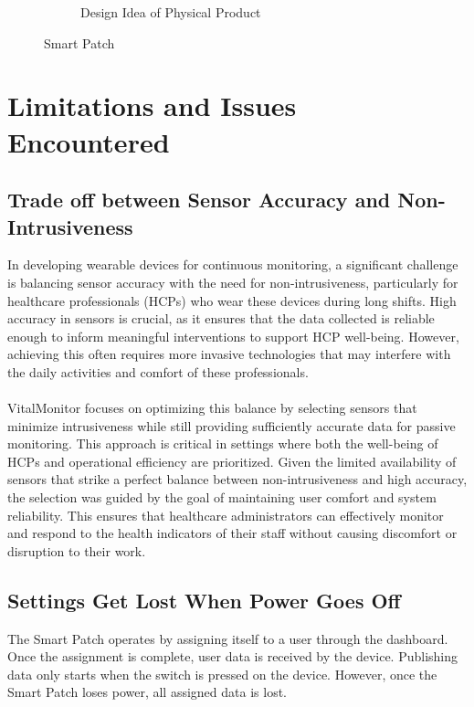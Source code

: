\begin{figure}[h!]
\begin{subfigure}[b]{0.45\linewidth}
        \caption{Design Idea of Physical Product}
        \label{fig:fig-design}
    \end{subfigure}
    \caption{Smart Patch}
    \label{fig:fig-smartpatch}
\end{figure}

\section{Limitations and Issues Encountered}

\subsection{Trade off between Sensor Accuracy and Non-Intrusiveness}
In developing wearable devices for continuous monitoring, a significant challenge is balancing sensor accuracy with the need for non-intrusiveness, particularly for healthcare professionals (HCPs) who wear these devices during long shifts. High accuracy in sensors is crucial, as it ensures that the data collected is reliable enough to inform meaningful interventions to support HCP well-being. However, achieving this often requires more invasive technologies that may interfere with the daily activities and comfort of these professionals.\\ \\
VitalMonitor focuses on optimizing this balance by selecting sensors that minimize intrusiveness while still providing sufficiently accurate data for passive monitoring. This approach is critical in settings where both the well-being of HCPs and operational efficiency are prioritized. Given the limited availability of sensors that strike a perfect balance between non-intrusiveness and high accuracy, the selection was guided by the goal of maintaining user comfort and system reliability. This ensures that healthcare administrators can effectively monitor and respond to the health indicators of their staff without causing discomfort or disruption to their work.

\subsection{Settings Get Lost When Power Goes Off}
The Smart Patch operates by assigning itself to a user through the dashboard. Once the assignment is complete, user data is received by the device. Publishing data only starts when the switch is pressed on the device. However, once the Smart Patch loses power, all assigned data is lost.\\

